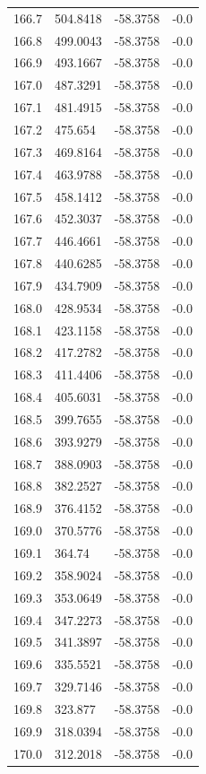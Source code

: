 \begin{table}[H]
\begin{tabular}{llll}
166.7 & 504.8418 & -58.3758 & -0.0 \\
166.8 & 499.0043 & -58.3758 & -0.0 \\
166.9 & 493.1667 & -58.3758 & -0.0 \\
167.0 & 487.3291 & -58.3758 & -0.0 \\
167.1 & 481.4915 & -58.3758 & -0.0 \\
167.2 & 475.654 & -58.3758 & -0.0 \\
167.3 & 469.8164 & -58.3758 & -0.0 \\
167.4 & 463.9788 & -58.3758 & -0.0 \\
167.5 & 458.1412 & -58.3758 & -0.0 \\
167.6 & 452.3037 & -58.3758 & -0.0 \\
167.7 & 446.4661 & -58.3758 & -0.0 \\
167.8 & 440.6285 & -58.3758 & -0.0 \\
167.9 & 434.7909 & -58.3758 & -0.0 \\
168.0 & 428.9534 & -58.3758 & -0.0 \\
168.1 & 423.1158 & -58.3758 & -0.0 \\
168.2 & 417.2782 & -58.3758 & -0.0 \\
168.3 & 411.4406 & -58.3758 & -0.0 \\
168.4 & 405.6031 & -58.3758 & -0.0 \\
168.5 & 399.7655 & -58.3758 & -0.0 \\
168.6 & 393.9279 & -58.3758 & -0.0 \\
168.7 & 388.0903 & -58.3758 & -0.0 \\
168.8 & 382.2527 & -58.3758 & -0.0 \\
168.9 & 376.4152 & -58.3758 & -0.0 \\
169.0 & 370.5776 & -58.3758 & -0.0 \\
169.1 & 364.74 & -58.3758 & -0.0 \\
169.2 & 358.9024 & -58.3758 & -0.0 \\
169.3 & 353.0649 & -58.3758 & -0.0 \\
169.4 & 347.2273 & -58.3758 & -0.0 \\
169.5 & 341.3897 & -58.3758 & -0.0 \\
169.6 & 335.5521 & -58.3758 & -0.0 \\
169.7 & 329.7146 & -58.3758 & -0.0 \\
169.8 & 323.877 & -58.3758 & -0.0 \\
169.9 & 318.0394 & -58.3758 & -0.0 \\
170.0 & 312.2018 & -58.3758 & -0.0 \\

\end{tabular}
\end{table}
